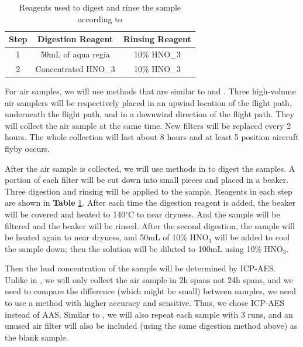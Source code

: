 \documentclass[12pt]{article}
\begin{document}
\begin{table}
    \centering
    \begin{tabular}[0.3\textwidth]{|c|c|c|}
    \hline
    Step & Digestion Reagent & Rinsing Reagent \\ \hline
    1 & 50mL of aqua regia & 10\% HNO_{3} \\ \hline
    2 & Concentrated HNO_{3} & 10\% HNO_{3} \\ \hline 
    \end{tabular}
    \caption{\small{Reagents used to digest and rinse the sample according to \cite{gharaibeh_determination_2010}}}
    \label{tab:steps}
    \vspace{0.2cm}
\end{table}

For air samples, we will use methods that are similar to \cite{gharaibeh_determination_2010} and \cite{vijayanand_assessment_2008}. Three high-volume air samplers will be respectively placed in an upwind location of the flight path, underneath the flight path, and in a downwind direction of the flight path. They will collect the air sample at the same time. New filters will be replaced every 2 hours. The whole collection will last about 8 hours and at least 5 position aircraft flyby occurs. 


After the air sample is collected, we will use methods in \cite{gharaibeh_determination_2010} to digest the samples. A portion of each filter will be cut down into small pieces and placed in a beaker. Three digestion and rinsing will be applied to the sample. Reagents in each step are shown in \textbf{Table} \ref{tab:steps}. After each time the digestion reagent is added, the beaker will be covered and heated to 140$^{\circ}$C to near dryness. And the sample will be filtered and the beaker will be rinsed. After the second digestion, the sample will be heated again to near dryness, and 50mL of 10\% HNO$_{3}$ will be added to cool the sample down; then the solution will be diluted to 100mL using 10\% HNO$_{3}$. \cite{gharaibeh_determination_2010}


Then the lead concentration of the sample will be determined by ICP-AES. Unlike in \cite{gharaibeh_determination_2010}, we will only collect the air sample in 2h spans not 24h spans, and we need to compare the difference (which might be small) between samples, we need to use a method with higher accuracy and sensitive. Thus, we chose ICP-AES instead of AAS. Similar to \cite{gharaibeh_determination_2010}, we will also repeat each sample with 3 runs, and an unused air filter will also be included (using the same digestion method above) as the blank sample. 
\end{document}
